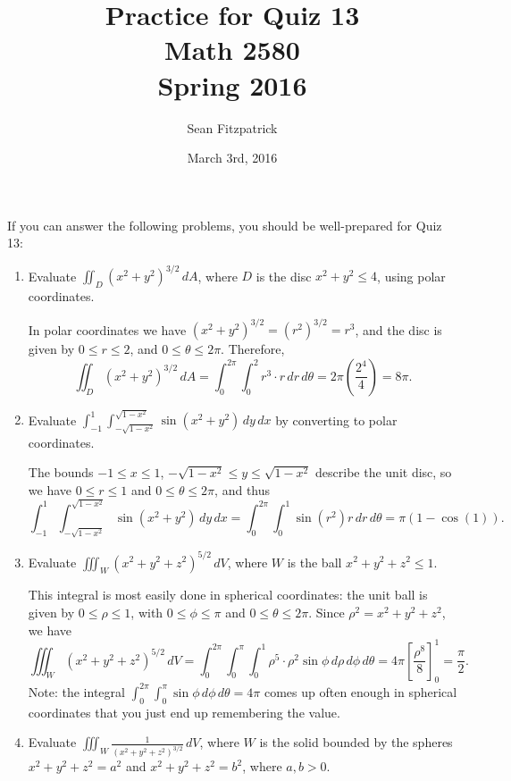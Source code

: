 \documentclass[letterpaper,12pt]{article}
\title{Practice for Quiz 13\\Math 2580\\Spring 2016}
\author{Sean Fitzpatrick}
\date{March 3rd, 2016}
\newcommand{\di}{\displaystyle}
\begin{document}
 \maketitle

If you can answer the following problems, you should be well-prepared for Quiz 13:



\begin{enumerate}
 \item Evaluate $\di \iint_D(x^2+y^2)^{3/2}\,dA$, where $D$ is the disc $x^2+y^2\leq 4$, using polar coordinates.

\bigskip

In polar coordinates we have $(x^2+y^2)^{3/2} = (r^2)^{3/2}=r^3$, and the disc is given by $0\leq r\leq 2$, and $0\leq \theta\leq 2\pi$. Therefore,
\[
 \iint_D(x^2+y^2)^{3/2}\,dA = \int_0^{2\pi}\int_0^2 r^3\cdot r \,dr\,d\theta = 2\pi\left(\frac{2^4}{4}\right) = 8\pi.
\]


 \item Evaluate $\di \int_{-1}^1\int_{-\sqrt{1-x^2}}^{\sqrt{1-x^2}}\sin(x^2+y^2)\,dy\,dx$ by converting to polar coordinates.

\bigskip

The bounds $-1\leq x\leq 1$, $-\sqrt{1-x^2}\leq y\leq \sqrt{1-x^2}$ describe the unit disc, so we have $0\leq r\leq 1$ and $0\leq \theta\leq 2\pi$, and thus
\[
 \int_{-1}^1\int_{-\sqrt{1-x^2}}^{\sqrt{1-x^2}}\sin(x^2+y^2)\,dy\,dx = \int_0^{2\pi}\int_0^1 \sin(r^2)r\,dr\,d\theta = \pi(1-\cos(1)).
\]

 \item Evaluate $\di \iiint_W (x^2+y^2+z^2)^{5/2}\,dV$, where $W$ is the ball $x^2+y^2+z^2\leq 1$.

\bigskip

This integral is most easily done in spherical coordinates: the unit ball is given by $0\leq \rho\leq 1$, with $0\leq \phi\leq \pi$ and $0\leq \theta\leq 2\pi$. Since $\rho^2=x^2+y^2+z^2$, we have
\[
 \iiint_W (x^2+y^2+z^2)^{5/2}\,dV = \int_0^{2\pi}\int_0^\pi\int_0^1\rho^5\cdot\rho^2\sin\phi\,d\rho\,d\phi\,d\theta = 4\pi\left[\frac{\rho^8}{8}\right]_0^1 = \frac{\pi}{2}.
\]
Note: the integral $\int_0^{2\pi}\int_0^\pi \sin\phi \,d\phi\,d\theta = 4\pi$ comes up often enough in spherical coordinates that you just end up remembering the value.

 \item Evaluate $\di \iiint_W \frac{1}{(x^2+y^2+z^2)^{3/2}}\,dV$, where $W$ is the solid bounded by the spheres $x^2+y^2+z^2=a^2$ and $x^2+y^2+z^2=b^2$, where $a,b>0$.


\end{enumerate}
\end{document}
